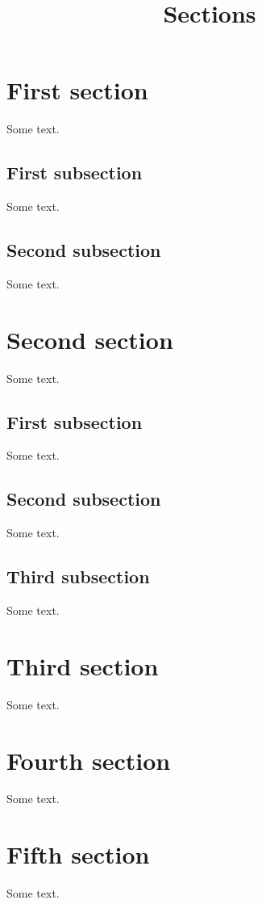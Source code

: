 \documentclass{amsart}
\title{Sections}
\begin{document}
\maketitle

\section{First section\label{sec1}}

Some text.

\subsection{First subsection}
Some text.

\subsection{Second subsection}

Some text.

\section{Second section}

Some text.

\subsection{First subsection}

Some text.

\subsection{\rm Second subsection}

Some text.

\subsection{{\rm Third subsection}}

Some text.

\section{Third section}

Some text.

\section{Fourth section}

Some text.

\section{Fifth section}

Some text.
\end{document}
